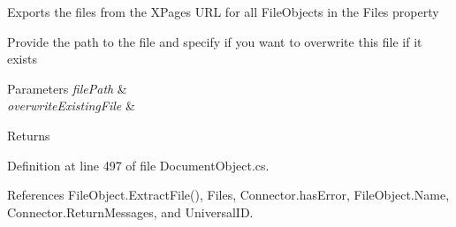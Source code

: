 Exports the files from the X\+Pages U\+RL for all File\+Objects in the Files property 

Provide the path to the file and specify if you want to overwrite this file if it exists


\begin{DoxyParams}{Parameters}
{\em file\+Path} & \\
\hline
{\em overwrite\+Existing\+File} & \\
\hline
\end{DoxyParams}
\begin{DoxyReturn}{Returns}

\end{DoxyReturn}


Definition at line 497 of file Document\+Object.\+cs.



References File\+Object.\+Extract\+File(), Files, Connector.\+has\+Error, File\+Object.\+Name, Connector.\+Return\+Messages, and Universal\+ID.



